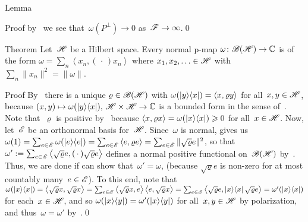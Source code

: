 \documentclass[a]{subfiles}
\begin{document}
\begin{parsec}
\begin{point}[bh-np-lemma]{Lemma}
\begin{point}{Proof}
by~
we see that~$\omega(P^\perp)\to0$
as~$\mathscr{F}\to\infty$.\qed
\end{point}
\end{point}
\begin{point}[bh-np]{Theorem}%
%
Let~$\mathscr{H}$ be a Hilbert space.
Every normal p-map $\omega\colon \mathscr{B}(\mathscr{H})\to \mathbb{C}$
is of the form $\omega = \sum_n\left<x_n,(\,\cdot\,)x_n\right>$
where $x_1,x_2,\dotsc\in \mathscr{H}$
with~$\sum_n \|x_n\|^2=\|\omega\|$.
\begin{point}{Proof}%
By~
there is a
unique
$\varrho\in\mathscr{B}(\mathscr{H})$
with $\omega(\left|y\right>\!\left<x\right|)=\left<x,\varrho y\right>$
for all~$x,y\in\mathscr{H}$,
because
$(x,y)\mapsto \omega(\left|y\right>\!\left<x\right|),\,
\mathscr{H}\times\mathscr{H}\to\mathbb{C}$
is a bounded form in the sense of~.
Note that~$\varrho$ 
is positive by~
because $\left<x,\varrho x\right>
=\omega(\left|x\right>\!\left<x\right|)\geqslant 0$
for all~$x\in\mathscr{H}$.
Now, let~$\mathscr{E}$ be an orthonormal basis for~$\mathscr{H}$.
Since~$\omega$ is normal,
 gives us
$\omega(1)=\sum_{e\in\mathscr{E}} \omega(\left|e\right>\!\left<e\right|)
= \sum_{e\in\mathscr{E}} \left<e,\varrho e\right>
= \sum_{e\in \mathscr{E}} \|\sqrt{\varrho} e\|^2$,
so that $\omega':=\sum_{e\in\mathscr{E}} \left<\sqrt{\varrho}e,(\,\cdot\,)
\sqrt{\varrho}e\right>$
defines a normal positive functional on~$\mathscr{B}(\mathscr{H})$
by~.
Thus,
we are done if
can show that~$\omega'=\omega$,
(because $\sqrt{\varrho}e$
is non-zero for at most countably many~$e\in\mathscr{E}$).
To this end,
note that
$\omega(\left|x\right>\!\left<x\right|)
= \left<\sqrt{\varrho}x,\sqrt{\varrho}x\right>
= \sum_{e\in \mathscr{E}}
\left<\sqrt{\varrho}x,e\right>
\left<e,\sqrt{\varrho}x\right>
= \sum_{e\in \mathscr{E}} \left< \sqrt{\varrho}e,
\left|x\right>\!\left<x\right| \sqrt{\varrho}e \right>
=\omega'(\left|x\right>\!\left<x\right|)$
for each~$x\in\mathscr{H}$,
and so $\omega(\left|x\right>\!\left<y\right|)=\omega'(\left|x\right>\!\left<y\right|)$
for all~$x,y\in\mathscr{H}$
by polarization,
and thus~$\omega=\omega'$
by~.\qed
\end{point}
\end{point}
\end{parsec}
\end{document}
